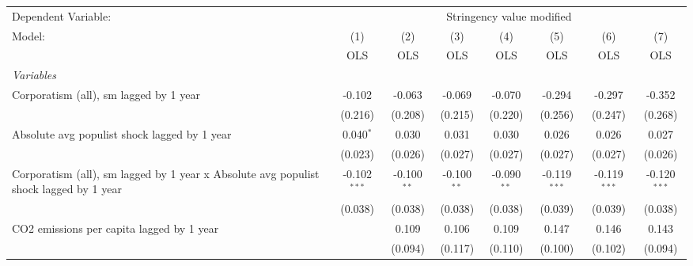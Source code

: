 
\begingroup
\centering
\begin{tabular}{lccccccc}
   \toprule
   Dependent Variable: & \multicolumn{7}{c}{Stringency value modified}\\
   Model:                                                                                & (1)            & (2)           & (3)           & (4)           & (5)            & (6)            & (7)\\  
                                                                                         &  OLS           & OLS           & OLS           & OLS           & OLS            & OLS            & OLS\\  
   \midrule
   \emph{Variables}\\
   Corporatism (all), sm lagged by 1 year                                                & -0.102         & -0.063        & -0.069        & -0.070        & -0.294         & -0.297         & -0.352\\   
                                                                                         & (0.216)        & (0.208)       & (0.215)       & (0.220)       & (0.256)        & (0.247)        & (0.268)\\   
   Absolute avg populist shock lagged by 1 year                                          & 0.040$^{*}$    & 0.030         & 0.031         & 0.030         & 0.026          & 0.026          & 0.027\\   
                                                                                         & (0.023)        & (0.026)       & (0.027)       & (0.027)       & (0.027)        & (0.027)        & (0.026)\\   
   Corporatism (all), sm lagged by 1 year x Absolute avg populist shock lagged by 1 year & -0.102$^{***}$ & -0.100$^{**}$ & -0.100$^{**}$ & -0.090$^{**}$ & -0.119$^{***}$ & -0.119$^{***}$ & -0.120$^{***}$\\   
                                                                                         & (0.038)        & (0.038)       & (0.038)       & (0.038)       & (0.039)        & (0.039)        & (0.038)\\   
   CO2 emissions per capita lagged by 1 year                                             &                & 0.109         & 0.106         & 0.109         & 0.147          & 0.146          & 0.143\\   
                                                                                         &                & (0.094)       & (0.117)       & (0.110)       & (0.100)        & (0.102)        & (0.094)\\   

\end{tabular}
